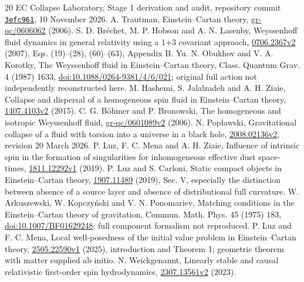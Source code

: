 \documentclass[11pt,a4paper]{article}
\begin{document}
\begin{thebibliography}{20}
 EC Collapse Laboratory, Stage 1 derivation and audit, repository commit \href{https://github.com/pdamkier-del/skovlab/tree/3efc96159537e834313ded3ba359624abaa8b26f/research/ec-spherical}{\texttt{3efc961}}, 10 November 2026.
 A. Trautman, Einstein--Cartan theory, \href{https://arxiv.org/abs/gr-qc/0606062}{gr-qc/0606062} (2006).
 S. D. Br\'echet, M. P. Hobson and A. N. Lasenby, Weyssenhoff fluid dynamics in general relativity using a 1+3 covariant approach, \href{https://arxiv.org/abs/0706.2367v2}{0706.2367v2} (2007), Eqs. (19)--(28), (60)--(63), Appendix B.
 Yu. N. Obukhov and V. A. Korotky, The Weyssenhoff fluid in Einstein--Cartan theory, Class. Quantum Grav. 4 (1987) 1633, \href{https://doi.org/10.1088/0264-9381/4/6/021}{doi:10.1088/0264-9381/4/6/021}; original full action not independently reconstructed here.
 M. Hashemi, S. Jalalzadeh and A. H. Ziaie, Collapse and dispersal of a homogeneous spin fluid in Einstein--Cartan theory, \href{https://arxiv.org/html/1407.4103v2}{1407.4103v2} (2015).
 C. G. B\"ohmer and P. Bronowski, The homogeneous and isotropic Weyssenhoff fluid, \href{https://arxiv.org/abs/gr-qc/0601089v2}{gr-qc/0601089v2} (2006).
 N. Pop\l awski, Gravitational collapse of a fluid with torsion into a universe in a black hole, \href{https://arxiv.org/html/2008.02136v2}{2008.02136v2}, revision 20 March 2026.
 P. Luz, F. C. Mena and A. H. Ziaie, Influence of intrinsic spin in the formation of singularities for inhomogeneous effective dust space-times, \href{https://arxiv.org/abs/1811.12292v1}{1811.12292v1} (2019).
 P. Luz and S. Carloni, Static compact objects in Einstein--Cartan theory, \href{https://arxiv.org/abs/1907.11489}{1907.11489} (2019), Sec. V, especially the distinction between absence of a source layer and absence of distributional full curvature.
 W. Arkuszewski, W. Kopczy\'nski and V. N. Ponomariev, Matching conditions in the Einstein--Cartan theory of gravitation, Commun. Math. Phys. 45 (1975) 183, \href{https://doi.org/10.1007/BF01629248}{doi:10.1007/BF01629248}; full component formalism not reproduced.
 P. Luz and F. C. Mena, Local well-posedness of the initial value problem in Einstein--Cartan theory, \href{https://arxiv.org/abs/2505.22590v1}{2505.22590v1} (2025), introduction and Theorem 1; geometric theorem with matter supplied ab initio.
 N. Weickgenannt, Linearly stable and causal relativistic first-order spin hydrodynamics, \href{https://arxiv.org/abs/2307.13561v2}{2307.13561v2} (2023).

\end{thebibliography}
\end{document}
